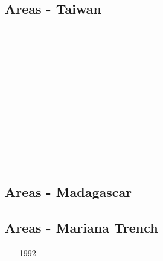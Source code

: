 \subsection{Areas - Taiwan}

\begin{scriptsize}
\begin{itemize}
\item[\twothousandone]
\textcite{chys01} \\
\item[\twothousandsix]
\textcite{fuwf06} \\
\item[\twothousandeight]
\textcite{kasb08} \\
\item[\twothousandnine]
\textcite{yamb09} \\
\textcite{kalb09} \\
\item[\twothousandsixteen]
\textcite{gukt16} \\
\textcite{liku16} \\
\item[\twothousandnineteen]
\textcite{wakz19} \\
\end{itemize}
\end{scriptsize}

\subsection{Areas - Madagascar}

\begin{scriptsize}
\begin{itemize}
\item[\twothousandtwenty]
\textcite{rasf20}  
\end{itemize}
\end{scriptsize}

\subsection{Areas - Mariana Trench}

\begin{scriptsize}
\begin{itemize}
\item[1992]
\textcite{stbl92}\\
\item[\twothousandfifteen]
\textcite{yotr15}\\
\textcite{arib15}\\
\textcite{zhlb15}\\
\item[\twothousandeighteen]
\textcite{fahb18}\\
\end{itemize}
\end{scriptsize}


